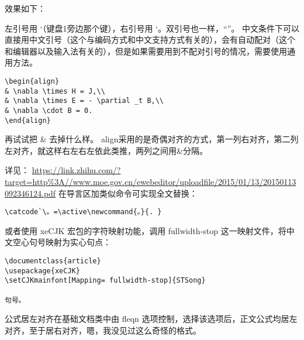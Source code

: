效果如下：



左引号用 `（键盘1旁边那个键），右引号用 `。双引号也一样，``''。
中文条件下可以直接用中文引号（这个与编码方式和中文支持方式有关的），会有自动配对（这个和编辑器以及输入法有关的），但是如果需要用到不配对引号的情况，需要使用通用方法。




\begin{verbatim}
\begin{align}
& \nabla \times H = J,\\
& \nabla \times E = - \partial _t B,\\
& \nabla \cdot B = 0.
\end{align}
\end{verbatim}

再试试把 \& 去掉什么样。
align采用的是奇偶对齐的方式，第一列右对齐，第二列左对齐，就这样右左右左依此类推，两列之间用\&分隔。



详见：
\url{https://link.zhihu.com/?target=http\%3A//www.moe.gov.cn/ewebeditor/uploadfile/2015/01/13/20150113092346124.pdf}
在导言区加类似命令可实现全文替换：

\begin{verbatim}
\catcode`\。=\active\newcommand{。}{. }
\end{verbatim}

或者使用 xeCJK 宏包的字符映射功能，调用 fullwidth-stop
这一映射文件，将中文空心句号映射为实心句点：

\begin{verbatim}
\documentclass{article}
\usepackage{xeCJK}
\setCJKmainfont[Mapping= fullwidth-stop]{STSong}

句号。

\end{verbatim}



公式居左对齐在基础文档类中由 fleqn
选项控制，选择该选项后，正文公式均居左对齐，至于居右对齐，嗯，我没见过这么奇怪的格式。


